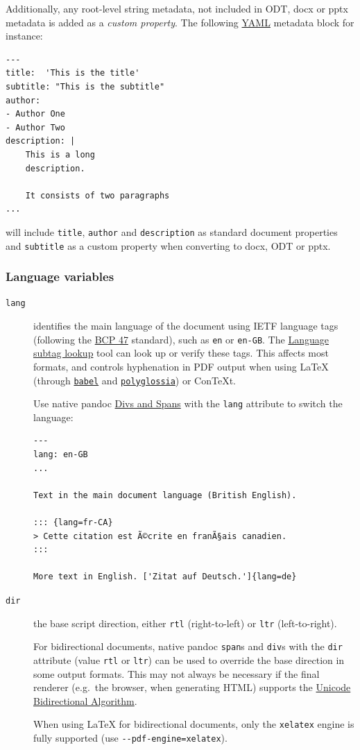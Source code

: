 \documentclass[
]{article}
\begin{document}
Additionally, any root-level string metadata, not included in ODT, docx
or pptx metadata is added as a \emph{custom property}. The following
\href{https://yaml.org/spec/1.2/spec.html}{YAML} metadata block for
instance:

\begin{verbatim}
---
title:  'This is the title'
subtitle: "This is the subtitle"
author:
- Author One
- Author Two
description: |
    This is a long
    description.

    It consists of two paragraphs
...
\end{verbatim}

will include \texttt{title}, \texttt{author} and \texttt{description} as
standard document properties and \texttt{subtitle} as a custom property
when converting to docx, ODT or pptx.

\hypertarget{language-variables}{%
\subsubsection{Language variables}\label{language-variables}}

\begin{description}
\item[\texttt{lang}]
identifies the main language of the document using IETF language tags
(following the \href{https://tools.ietf.org/html/bcp47}{BCP 47}
standard), such as \texttt{en} or \texttt{en-GB}. The
\href{https://r12a.github.io/app-subtags/}{Language subtag lookup} tool
can look up or verify these tags. This affects most formats, and
controls hyphenation in PDF output when using LaTeX (through
\href{https://ctan.org/pkg/babel}{\texttt{babel}} and
\href{https://ctan.org/pkg/polyglossia}{\texttt{polyglossia}}) or
ConTeXt.

Use native pandoc \protect\hyperlink{divs-and-spans}{Divs and Spans}
with the \texttt{lang} attribute to switch the language:

\begin{verbatim}
---
lang: en-GB
...

Text in the main document language (British English).

::: {lang=fr-CA}
> Cette citation est Ã©crite en franÃ§ais canadien.
:::

More text in English. ['Zitat auf Deutsch.']{lang=de}
\end{verbatim}
\item[\texttt{dir}]
the base script direction, either \texttt{rtl} (right-to-left) or
\texttt{ltr} (left-to-right).

For bidirectional documents, native pandoc \texttt{span}s and
\texttt{div}s with the \texttt{dir} attribute (value \texttt{rtl} or
\texttt{ltr}) can be used to override the base direction in some output
formats. This may not always be necessary if the final renderer
(e.g.~the browser, when generating HTML) supports the
\href{https://www.w3.org/International/articles/inline-bidi-markup/uba-basics}{Unicode
Bidirectional Algorithm}.

When using LaTeX for bidirectional documents, only the \texttt{xelatex}
engine is fully supported (use \texttt{-\/-pdf-engine=xelatex}).
\end{description}
\end{document}
